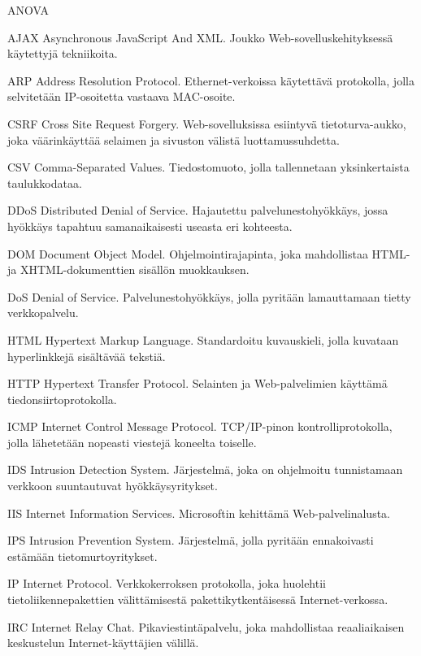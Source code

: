 
\termlist

\begin{abbrlist}{ANOVA}
\item[AJAX]	Asynchronous JavaScript And XML. Joukko Web-sovelluskehityksessä käytettyjä tekniikoita.
\item[ARP]	Address Resolution Protocol. Ethernet-verkoissa käytettävä protokolla, jolla selvitetään IP-osoitetta vastaava MAC-osoite.
\item[CSRF]	Cross Site Request Forgery. Web-sovelluksissa esiintyvä tietoturva-aukko, joka väärinkäyttää selaimen ja sivuston välistä luottamussuhdetta.
\item[CSV]	Comma-Separated Values. Tiedostomuoto, jolla tallennetaan yksinkertaista taulukkodataa.
\item[DDoS]	Distributed Denial of Service. Hajautettu palvelunestohyökkäys, jossa hyökkäys tapahtuu samanaikaisesti useasta eri kohteesta.
\item[DOM]	Document Object Model. Ohjelmointirajapinta, joka mahdollistaa HTML- ja XHTML-dokumenttien sisällön muokkauksen.
\item[DoS]	Denial of Service. Palvelunestohyökkäys, jolla pyritään lamauttamaan tietty verkkopalvelu.
\item[HTML]	Hypertext Markup Language. Standardoitu kuvauskieli, jolla kuvataan hyperlinkkejä sisältävää tekstiä.
\item[HTTP]     Hypertext Transfer Protocol. Selainten ja Web-palvelimien käyttämä tiedonsiirtoprotokolla.
\item[ICMP]	Internet Control Message Protocol. TCP/IP-pinon kontrolliprotokolla, jolla lähetetään nopeasti viestejä koneelta toiselle.
\item[IDS]	Intrusion Detection System. Järjestelmä, joka on ohjelmoitu tunnistamaan verkkoon suuntautuvat hyökkäysyritykset.
\item[IIS]      Internet Information Services. Microsoftin kehittämä Web-palvelinalusta.
\item[IPS]	Intrusion Prevention System. Järjestelmä, jolla pyritään ennakoivasti estämään tietomurtoyritykset.
\item[IP]	Internet Protocol. Verkkokerroksen protokolla, joka huolehtii tietoliikennepakettien välittämisestä pakettikytkentäisessä Internet-verkossa.
\item[IRC]	Internet Relay Chat. Pikaviestintäpalvelu, joka mahdollistaa reaaliaikaisen keskustelun Internet-käyttäjien välillä.

\end{abbrlist}

